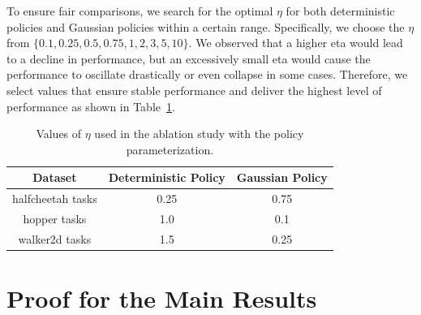 To ensure fair comparisons, we search for the optimal $\eta$ for both deterministic policies and Gaussian policies within a certain range. Specifically, we choose the $\eta$ from $\{0.1, 0.25, 0.5, 0.75, 1, 2, 3, 5, 10\}$. We observed that a higher eta would lead to a decline in performance, but an excessively small eta would cause the performance to oscillate drastically or even collapse in some cases. Therefore, we select values that ensure stable performance and deliver the highest level of performance as shown in Table~\ref{apptab:arch_abla_param}. 
\begin{table}[htbp]
    \centering
    \caption{Values of $\eta$ used in the ablation study with the policy parameterization.}
    \label{apptab:arch_abla_param}
    \begin{tabular}{c|c|c}
        \toprule
        Dataset & Deterministic Policy & Gaussian Policy\\
        \midrule
        halfcheetah tasks & 0.25 & 0.75\\
        \midrule
        hopper tasks & 1.0 & 0.1 \\
        \midrule
        walker2d tasks & 1.5 & 0.25\\
        \bottomrule
    \end{tabular}
\end{table}

\section{Proof for the Main Results}\label{appsec:proof}

